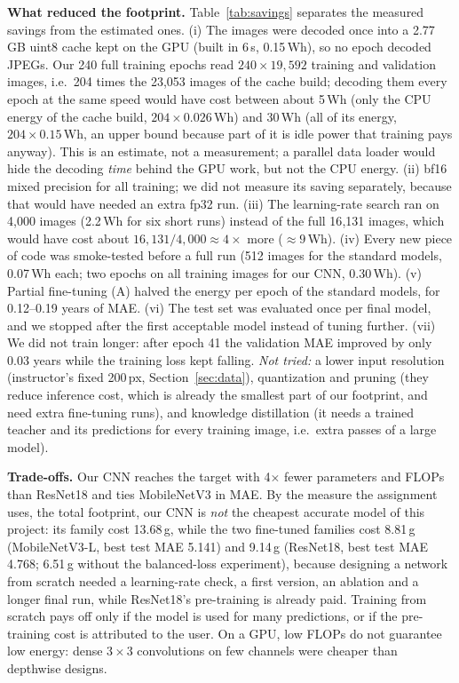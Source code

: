 \documentclass[conference,a4paper]{IEEEtran}
\begin{document}
\textbf{What reduced the footprint.} Table~\ref{tab:savings} separates the measured savings from the estimated ones. (i) The images were decoded once into a 2.77\,GB uint8 cache kept on the GPU (built in 6\,s, 0.15\,Wh), so no epoch decoded JPEGs. Our 240 full training epochs read $240\times19{,}592$ training and validation images, i.e.\ 204 times the 23{,}053 images of the cache build; decoding them every epoch at the same speed would have cost between about 5\,Wh (only the CPU energy of the cache build, $204\times0.026$\,Wh) and 30\,Wh (all of its energy, $204\times0.15$\,Wh, an upper bound because part of it is idle power that training pays anyway). This is an estimate, not a measurement; a parallel data loader would hide the decoding \emph{time} behind the GPU work, but not the CPU energy. (ii) bf16 mixed precision for all training; we did not measure its saving separately, because that would have needed an extra fp32 run. (iii) The learning-rate search ran on 4{,}000 images (2.2\,Wh for six short runs) instead of the full 16{,}131 images, which would have cost about $16{,}131/4{,}000 \approx 4\times$ more ($\approx9$\,Wh). (iv) Every new piece of code was smoke-tested before a full run (512 images for the standard models, 0.07\,Wh each; two epochs on all training images for our CNN, 0.30\,Wh). (v) Partial fine-tuning (A) halved the energy per epoch of the standard models, for 0.12--0.19 years of MAE. (vi) The test set was evaluated once per final model, and we stopped after the first acceptable model instead of tuning further. (vii) We did not train longer: after epoch 41 the validation MAE improved by only 0.03 years while the training loss kept falling. \emph{Not tried:} a lower input resolution (instructor's fixed 200\,px, Section~\ref{sec:data}), quantization and pruning (they reduce inference cost, which is already the smallest part of our footprint, and need extra fine-tuning runs), and knowledge distillation (it needs a trained teacher and its predictions for every training image, i.e.\ extra passes of a large model).

\textbf{Trade-offs.} Our CNN reaches the target with 4$\times$ fewer parameters and FLOPs than ResNet18 and ties MobileNetV3 in MAE. By the measure the assignment uses, the total footprint, our CNN is \emph{not} the cheapest accurate model of this project: its family cost 13.68\,g, while the two fine-tuned families cost 8.81\,g (MobileNetV3-L, best test MAE 5.141) and 9.14\,g (ResNet18, best test MAE 4.768; 6.51\,g without the balanced-loss experiment), because designing a network from scratch needed a learning-rate check, a first version, an ablation and a longer final run, while ResNet18's pre-training is already paid. Training from scratch pays off only if the model is used for many predictions, or if the pre-training cost is attributed to the user. On a GPU, low FLOPs do not guarantee low energy: dense $3\times3$ convolutions on few channels were cheaper than depthwise designs.
\end{document}
